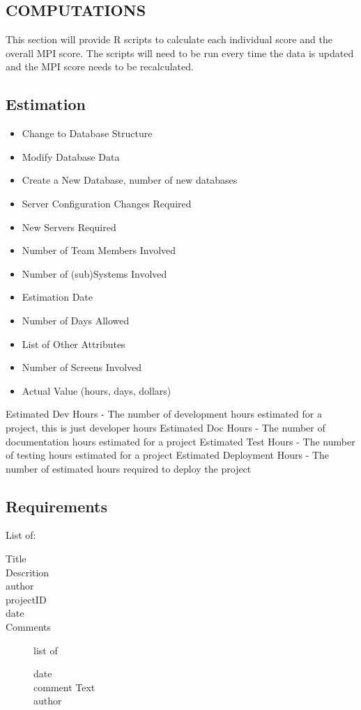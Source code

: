 \documentclass[SDSUThesis.tex]{subfiles}
\begin{document}
\subsection{COMPUTATIONS}
    This section will provide R scripts to calculate each individual score and the overall 
    MPI score. The scripts will need to be run every time the data is updated and the MPI
    score needs to be recalculated.


    \subsection{Estimation}
    
    \begin{itemize}
    \item Change to Database Structure  
    \item Modify Database Data    
    \item Create a New Database, number of new databases  
    \item Server Configuration Changes Required   
    \item New Servers Required   
    \item Number of Team Members Involved  
    \item Number of (sub)Systems Involved  
    \item Estimation Date
    \item Number of Days Allowed
    \item List of Other Attributes
    \item Number of Screens Involved 
    \item Actual Value (hours, days, dollars) 
    \end{itemize}
    
    
    Estimated Dev Hours - The number of development hours estimated for a project, this is just developer hours
    Estimated Doc Hours - The number of documentation hours estimated for a project
    Estimated Test Hours - The number of testing hours estimated for a project
    Estimated Deployment Hours - The number of estimated hours required to deploy the project
    
    \subsection{Requirements}
    List of: 
    \begin{description}
      \item[Title] 
      \item[Descrition]
      \item[author]
      \item[projectID]
      \item[date]
      \item[Comments] list of \\
      \begin{description}
        \item[date]
        \item[comment Text]
        \item[author]
      \end{description}
    \end{description}
    
\end{document}
